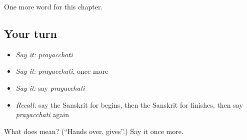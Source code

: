 \begin{grammarlens}[title={What you've built}]
One more word for this chapter.
\end{grammarlens}

\subsection*{Your turn}
\begin{itemize}
\raggedright
  \item \emph{Say it:} \emph{prayacchati}
  \item \emph{Say it:} \emph{prayacchati}, once more
  \item \emph{Say it:} say \emph{prayacchati}
  \item \emph{Recall:} say the Sanskrit for begins, then the Sanskrit for finishes, then say \emph{prayacchati} again
\end{itemize}

\begin{tcolorbox}[breakable,colback=teal!4,colframe=teal!35!black,title={Before you move on}]
What does  mean? (\textquotedblleft{}Hands over, gives\textquotedblright{}.) Say it once more.
\end{tcolorbox}
